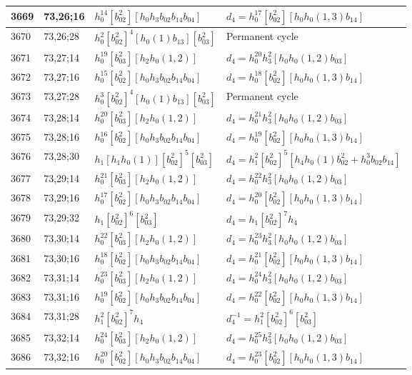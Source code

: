 \documentclass{article}
\begin{document}
\begin{longtable}{|l|l|>{\raggedright\arraybackslash}p{6cm}|>{\raggedright\arraybackslash}p{6cm}|}
\hline
3669 & 73,26;16 & $h_0^{14}[b_{02}^2][h_0h_3b_{02}b_{14}b_{04}]$ &$d_{4}=h_0^{17}[b_{02}^2][h_0h_0(1, 3)b_{14}]$\\
\hline
3670 & 73,26;28 & $h_0^2[b_{02}^2]^4[h_0(1)b_{13}][b_{03}^2]$ & Permanent cycle\\
\hline
3671 & 73,27;14 & $h_0^{19}[b_{03}^2][h_2h_0(1, 2)]$ &$d_{4}=h_0^{20}h_3^2[h_0h_0(1, 2)b_{03}]$\\
\hline
3672 & 73,27;16 & $h_0^{15}[b_{02}^2][h_0h_3b_{02}b_{14}b_{04}]$ &$d_{4}=h_0^{18}[b_{02}^2][h_0h_0(1, 3)b_{14}]$\\
\hline
3673 & 73,27;28 & $h_0^3[b_{02}^2]^4[h_0(1)b_{13}][b_{03}^2]$ & Permanent cycle\\
\hline
3674 & 73,28;14 & $h_0^{20}[b_{03}^2][h_2h_0(1, 2)]$ &$d_{4}=h_0^{21}h_3^2[h_0h_0(1, 2)b_{03}]$\\
\hline
3675 & 73,28;16 & $h_0^{16}[b_{02}^2][h_0h_3b_{02}b_{14}b_{04}]$ &$d_{4}=h_0^{19}[b_{02}^2][h_0h_0(1, 3)b_{14}]$\\
\hline
3676 & 73,28;30 & $h_1[h_1h_0(1)][b_{02}^2]^5[b_{03}^2]$ &$d_{4}=h_1^2[b_{02}^2]^5[h_4h_0(1)b_{02}^2 + h_0^3b_{02}b_{14}]$\\
\hline
3677 & 73,29;14 & $h_0^{21}[b_{03}^2][h_2h_0(1, 2)]$ &$d_{4}=h_0^{22}h_3^2[h_0h_0(1, 2)b_{03}]$\\
\hline
3678 & 73,29;16 & $h_0^{17}[b_{02}^2][h_0h_3b_{02}b_{14}b_{04}]$ &$d_{4}=h_0^{20}[b_{02}^2][h_0h_0(1, 3)b_{14}]$\\
\hline
3679 & 73,29;32 & $h_1[b_{02}^2]^6[b_{03}^2]$ &$d_{4}=h_1[b_{02}^2]^7h_4$\\
\hline
3680 & 73,30;14 & $h_0^{22}[b_{03}^2][h_2h_0(1, 2)]$ &$d_{4}=h_0^{23}h_3^2[h_0h_0(1, 2)b_{03}]$\\
\hline
3681 & 73,30;16 & $h_0^{18}[b_{02}^2][h_0h_3b_{02}b_{14}b_{04}]$ &$d_{4}=h_0^{21}[b_{02}^2][h_0h_0(1, 3)b_{14}]$\\
\hline
3682 & 73,31;14 & $h_0^{23}[b_{03}^2][h_2h_0(1, 2)]$ &$d_{4}=h_0^{24}h_3^2[h_0h_0(1, 2)b_{03}]$\\
\hline
3683 & 73,31;16 & $h_0^{19}[b_{02}^2][h_0h_3b_{02}b_{14}b_{04}]$ &$d_{4}=h_0^{22}[b_{02}^2][h_0h_0(1, 3)b_{14}]$\\
\hline
3684 & 73,31;28 & $h_1^2[b_{02}^2]^7h_4$ & $d_{4}^{-1}=h_1^2[b_{02}^2]^6[b_{03}^2]$\\
\hline
3685 & 73,32;14 & $h_0^{24}[b_{03}^2][h_2h_0(1, 2)]$ &$d_{4}=h_0^{25}h_3^2[h_0h_0(1, 2)b_{03}]$\\
\hline
3686 & 73,32;16 & $h_0^{20}[b_{02}^2][h_0h_3b_{02}b_{14}b_{04}]$ &$d_{4}=h_0^{23}[b_{02}^2][h_0h_0(1, 3)b_{14}]$\\

\end{longtable}
\end{document}
